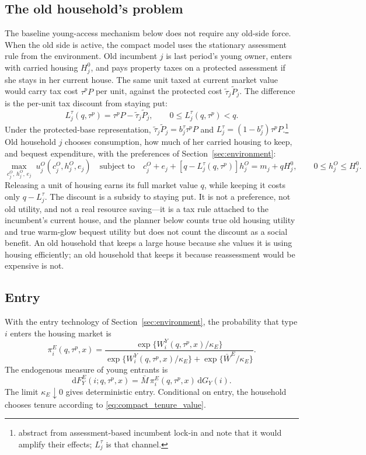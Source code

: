 \documentclass[11pt]{article}
\newcommand{\dd}{\mathrm d}
\newcommand{\1}{\mathbf 1}
\begin{document}
\subsection{The old household's problem}

The baseline young-access mechanism below does not require any old-side force. When the old side is active, the compact model uses the stationary assessment rule from the environment. Old incumbent $j$ is last period's young owner, enters with carried housing $H_j^0$, and pays property taxes on a protected assessment if she stays in her current house. The same unit taxed at current market value would carry tax cost $\tau^pP$ per unit, against the protected cost $\tilde\tau_j\tilde P_j$. The difference is the per-unit tax discount from staying put:
\[
L_j^\tau(q,\tau^p)
=
\tau^pP-\tilde\tau_j\tilde P_j,
\qquad
0\le L_j^\tau(q,\tau^p)<q.
\]
Under the protected-base representation, $\tilde\tau_j\tilde P_j=b_j^\tau\tau^pP$ and $L_j^\tau=(1-b_j^\tau)\tau^pP$.\footnote{\citet{coven2024} abstract from assessment-based incumbent lock-in and note that it would amplify their effects; $L_j^\tau$ is that channel.} Old household $j$ chooses consumption, how much of her carried housing to keep, and bequest expenditure, with the preferences of Section~\ref{sec:environment}:
\begin{equation}
\max_{c_j^O,\,h_j^O,\,e_j}\;
u_j^O(c_j^O,h_j^O,e_j)
\quad\text{subject to}\quad
c_j^O+e_j+
\left[q-L_j^\tau(q,\tau^p)\right]h_j^O
=
m_j+q H_j^0,
\qquad
0\le h_j^O\le H_j^0.
\label{eq:compact_old_budget}
\end{equation}
Releasing a unit of housing earns its full market value $q$, while keeping it costs only $q-L_j^\tau$. The discount is a subsidy to staying put. It is not a preference, not old utility, and not a real resource saving---it is a tax rule attached to the incumbent's current house, and the planner below counts true old housing utility and true warm-glow bequest utility but does not count the discount as a social benefit. An old household that keeps a large house because she values it is using housing efficiently; an old household that keeps it because reassessment would be expensive is not.

\subsection{Entry}

With the entry technology of Section~\ref{sec:environment}, the probability that type $i$ enters the housing market is
\begin{equation}
\pi_i^E(q,\tau^p,x)
=
\frac{
\exp\{W_i^Y(q,\tau^p,x)/\kappa_E\}
}{
\exp\{W_i^Y(q,\tau^p,x)/\kappa_E\}
+
\exp\{\bar W^E/\kappa_E\}
}.
\label{eq:compact_entry_prob}
\end{equation}
The endogenous measure of young entrants is
\[
\dd F_Y^E(i;q,\tau^p,x)
=
\bar M\,\pi_i^E(q,\tau^p,x)\,\dd G_Y(i).
\]
The limit $\kappa_E\downarrow0$ gives deterministic entry. Conditional on entry, the household chooses tenure according to \eqref{eq:compact_tenure_value}.
\end{document}
